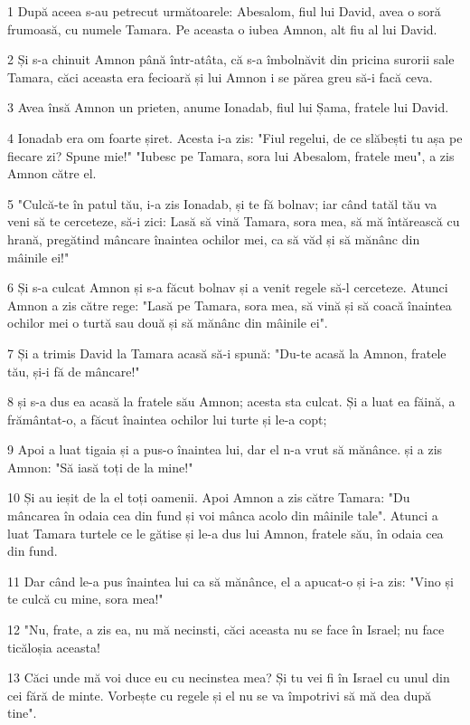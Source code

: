 \par 1 După aceea s-au petrecut următoarele: Abesalom, fiul lui David, avea o soră frumoasă, cu numele Tamara. Pe aceasta o iubea Amnon, alt fiu al lui David.
\par 2 Și s-a chinuit Amnon până într-atâta, că s-a îmbolnăvit din pricina surorii sale Tamara, căci aceasta era fecioară și lui Amnon i se părea greu să-i facă ceva.
\par 3 Avea însă Amnon un prieten, anume Ionadab, fiul lui Șama, fratele lui David.
\par 4 Ionadab era om foarte șiret. Acesta i-a zis: "Fiul regelui, de ce slăbești tu așa pe fiecare zi? Spune mie!" "Iubesc pe Tamara, sora lui Abesalom, fratele meu", a zis Amnon către el.
\par 5 "Culcă-te în patul tău, i-a zis Ionadab, și te fă bolnav; iar când tatăl tău va veni să te cerceteze, să-i zici: Lasă să vină Tamara, sora mea, să mă întărească cu hrană, pregătind mâncare înaintea ochilor mei, ca să văd și să mănânc din mâinile ei!"
\par 6 Și s-a culcat Amnon și s-a făcut bolnav și a venit regele să-l cerceteze. Atunci Amnon a zis către rege: "Lasă pe Tamara, sora mea, să vină și să coacă înaintea ochilor mei o turtă sau două și să mănânc din mâinile ei".
\par 7 Și a trimis David la Tamara acasă să-i spună: "Du-te acasă la Amnon, fratele tău, și-i fă de mâncare!"
\par 8 și s-a dus ea acasă la fratele său Amnon; acesta sta culcat. Și a luat ea făină, a frământat-o, a făcut înaintea ochilor lui turte și le-a copt;
\par 9 Apoi a luat tigaia și a pus-o înaintea lui, dar el n-a vrut să mănânce. și a zis Amnon: "Să iasă toți de la mine!"
\par 10 Și au ieșit de la el toți oamenii. Apoi Amnon a zis către Tamara: "Du mâncarea în odaia cea din fund și voi mânca acolo din mâinile tale". Atunci a luat Tamara turtele ce le gătise și le-a dus lui Amnon, fratele său, în odaia cea din fund.
\par 11 Dar când le-a pus înaintea lui ca să mănânce, el a apucat-o și i-a zis: "Vino și te culcă cu mine, sora mea!"
\par 12 "Nu, frate, a zis ea, nu mă necinsti, căci aceasta nu se face în Israel; nu face ticăloșia aceasta!
\par 13 Căci unde mă voi duce eu cu necinstea mea? Și tu vei fi în Israel cu unul din cei fără de minte. Vorbește cu regele și el nu se va împotrivi să mă dea după tine".
